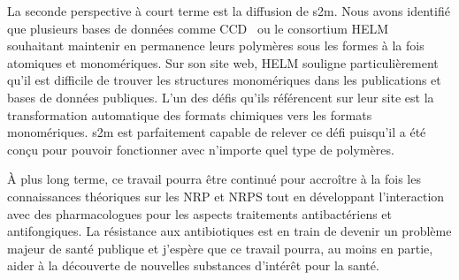 La seconde perspective à court terme est la diffusion de s2m.
Nous avons identifié que plusieurs bases de données comme CCD~\cite{rahman_small_2009} ou le consortium HELM~\cite{_helm_????} souhaitant maintenir en permanence leurs polymères sous les formes à la fois atomiques et monomériques.
Sur son site web, HELM souligne particulièrement qu'il est difficile de trouver les structures monomériques dans les publications et bases de données publiques.
L'un des défis qu'ils référencent sur leur site est la transformation automatique des formats chimiques vers les formats monomériques.
s2m est parfaitement capable de relever ce défi puisqu'il a été conçu pour pouvoir fonctionner avec n'importe quel type de polymères.

À plus long terme, ce travail pourra être continué pour accroître à la fois les connaissances théoriques sur les NRP et NRPS tout en développant l'interaction avec des pharmacologues pour les aspects traitements antibactériens et antifongiques.
La résistance aux antibiotiques est en train de devenir un problème majeur de santé publique et j'espère que ce travail pourra, au moins en partie, aider à la découverte de nouvelles substances d'intérêt pour la santé.

























